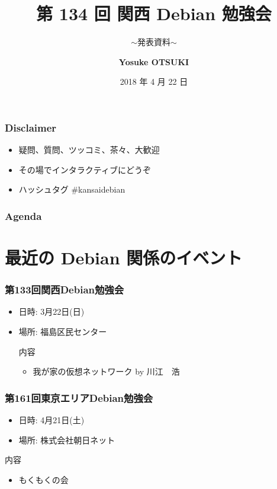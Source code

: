 \documentclass[cjk,dvipdfmx,10pt,compress,%
hyperref={bookmarks=true,bookmarksnumbered=true,bookmarksopen=false,%
colorlinks=false,%
pdftitle={第 132 回 関西 Debian 勉強会},%
pdfauthor={かわだ},%
pdfsubject={資料},%
}]{beamer}
\title{第 134 回 関西 Debian 勉強会}
\subtitle{$\sim$発表資料$\sim$}
\author[Yosuke OTSUKI]{{\large\bf Yosuke OTSUKI}}
\institute[Debian JP]{{\normalsize\tt 関西 Debian 勉強会}}
\date{{\small 2018 年 4 月 22 日}}
\begin{document}
\settitleslide
\begin{frame}
\titlepage
\end{frame}
\setdefaultslide

\begin{frame}[fragile]
  \frametitle{Disclaimer}
  \begin{itemize}
  \item 疑問、質問、ツッコミ、茶々、\alert{大歓迎}
  \item その場でインタラクティブにどうぞ
  \item ハッシュタグ \#kansaidebian
  \end{itemize}
\end{frame}

\begin{frame}[fragile]
\frametitle{Agenda}

\tableofcontents

\end{frame}

\section{最近の Debian 関係のイベント}

\begin{frame}[fragile]
  \frametitle{第133回関西Debian勉強会}
  \begin{itemize}
  \item 日時: 3月22日(日)
  \item 場所: 福島区民センター
  \begin{block}{内容}
    \begin{itemize}
    \item 我が家の仮想ネットワーク by  川江　浩
    \end{itemize}
  \end{block}
\end{itemize}
\end{frame}

\begin{frame}[fragile]
  \frametitle{第161回東京エリアDebian勉強会}
  \begin{itemize}
  \item 日時: 4月21日(土)
  \item 場所: 株式会社朝日ネット
  \end{itemize}
  \begin{block}{内容}
    \begin{itemize}
    \item もくもくの会
    \end{itemize}
  \end{block}
\end{frame}
\end{document}
